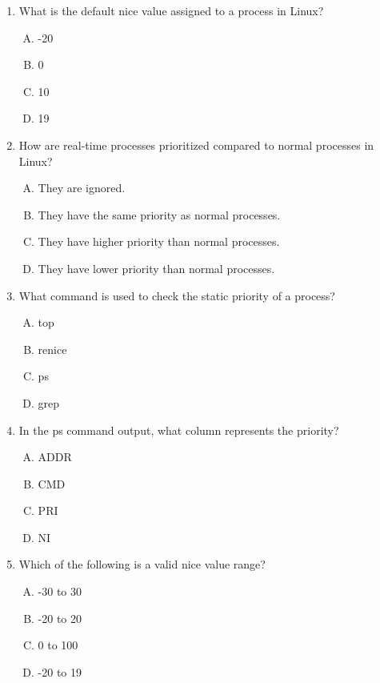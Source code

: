 \documentclass[a4paper]{report}
\begin{document}
\begin{enumerate}[1.]

    \item What is the default nice value assigned to a process in Linux?  
    \begin{enumerate}[A)]
        \item -20  
        \item 0  
        \item 10  
        \item 19  
    \end{enumerate}

    \item How are real-time processes prioritized compared to normal processes in Linux?  
    \begin{enumerate}[A)]
        \item They are ignored.  
        \item They have the same priority as normal processes.  
        \item They have higher priority than normal processes.  
        \item They have lower priority than normal processes.  
    \end{enumerate}

    \item What command is used to check the static priority of a process?  
    \begin{enumerate}[A)]
        \item top  
        \item renice  
        \item ps  
        \item grep  
    \end{enumerate}

    \item In the ps command output, what column represents the priority?  
    \begin{enumerate}[A)]
        \item ADDR  
        \item CMD  
        \item PRI  
        \item NI  
    \end{enumerate}

    \item Which of the following is a valid nice value range?  
    \begin{enumerate}[A)]
        \item -30 to 30  
        \item -20 to 20  
        \item 0 to 100  
        \item -20 to 19  
    \end{enumerate}


\end{enumerate}
\end{document}

